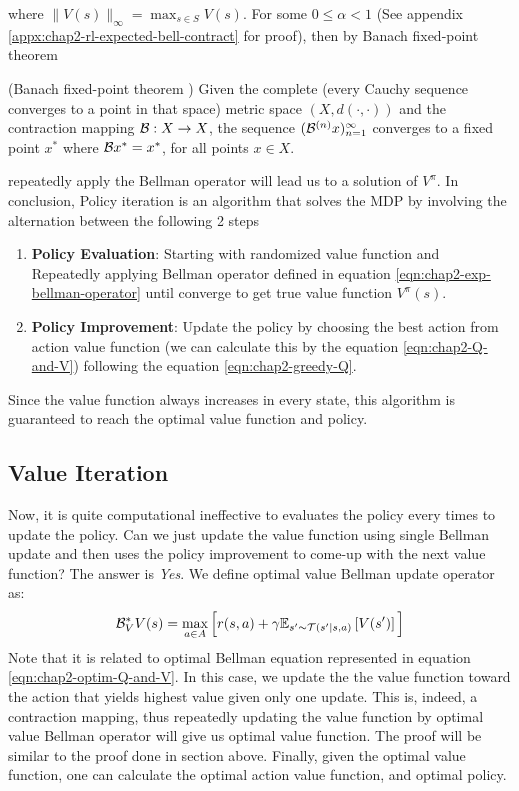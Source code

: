 where $\|V(s)\|_\infty = \max_{s \in S} V(s)$. For some $0 \le \alpha < 1$ (See appendix \ref{appx:chap2-rl-expected-bell-contract} for proof), then by Banach fixed-point theorem
\begin{theorem}{(Banach fixed-point theorem \cite{murfet_2019})}
    Given the complete (every Cauchy sequence converges to a point in that space) metric space $(X, d(\cdot, \cdot))$ and the contraction mapping $\mathcal{B} : X \rightarrow X$, the sequence $(\mathcal{B}^{(n)} x)^{\infty}_{n=1}$ converges to a fixed point $x^*$ where $\mathcal{B} x^* = x^*$, for all points $x \in X$. 
\end{theorem}
repeatedly apply the Bellman operator will lead us to a solution of $V^{\pi}$.  In conclusion, Policy iteration is an algorithm that solves the MDP by involving the alternation between the following 2 steps
\begin{enumerate}
    \item \textbf{Policy Evaluation}: Starting with randomized value function and Repeatedly applying Bellman operator defined in equation \ref{eqn:chap2-exp-bellman-operator} until converge to get true value function $V^{\pi}(s)$.
    \item \textbf{Policy Improvement}: Update the policy by choosing the best action from action value function (we can calculate this by the equation \ref{eqn:chap2-Q-and-V}) following the equation \ref{eqn:chap2-greedy-Q}.
\end{enumerate}
Since the value function always increases in every state, this algorithm is guaranteed to reach the optimal value function and policy. 

\subsection{Value Iteration}
\label{sec:chap2-value-iter}
Now, it is quite computational ineffective to evaluates the policy every times to update the policy. Can we just update the value function using single Bellman update and then uses the policy improvement to come-up with the next value function? The answer is \textit{Yes}. We define optimal value Bellman update operator as:
\begin{equation}
    \label{eqn:chap2-optimal-bellman-operator}
    \mathcal{B}^*_V V(s) = \max_{a \in A}\Big[r(s, a) + \gamma \mathbb{E}_{s' \sim \mathcal{T}(s' | s, a)}\left[ V(s') \right] \Big]
\end{equation}
Note that it is related to optimal Bellman equation represented in equation \ref{eqn:chap2-optim-Q-and-V}. In this case, we update the the value function toward the action that yields highest value given only one update. This is, indeed, a contraction mapping, thus repeatedly updating the value function by optimal value Bellman operator will give us optimal value function. The proof will be similar to the proof done in section above. Finally, given the optimal value function, one can calculate the optimal action value function, and optimal policy. 

